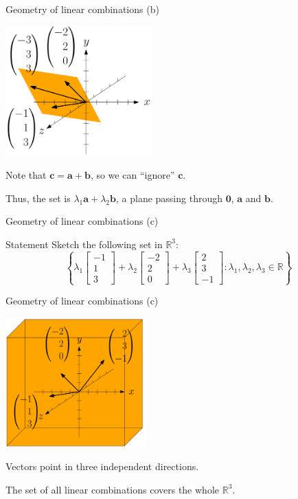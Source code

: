 \documentclass[10pt]{beamer}
\begin{document}
\begin{frame}{Geometry of linear combinations (b)}

    \begin{center}
        \includegraphics[height=5cm]{../img/png/3.b}
    \end{center}

    Note that $\mathbf c = \mathbf a + \mathbf b$, so we can ``ignore'' $\mathbf c$.

    Thus, the set is $\lambda_1 \mathbf a + \lambda_2 \mathbf b$, a plane passing through $\mathbf 0$, $\mathbf a$ and $\mathbf b$.
\end{frame}

\begin{frame}{Geometry of linear combinations (c)}
    \begin{block}{Statement}
    Sketch the following set in $\mathbb R^3$:
    $$\left\{\lambda_1 \begin{bmatrix}-1 \\ 1 \\ 3\end{bmatrix} + \lambda_2 \begin{bmatrix}-2 \\ 2 \\ 0\end{bmatrix} + \lambda_3 \begin{bmatrix}2 \\ 3 \\ -1\end{bmatrix} : \lambda_1, \lambda_2, \lambda_3 \in \mathbb R\right\}$$
    \end{block}
\end{frame}

\begin{frame}{Geometry of linear combinations (c)}
    \begin{center}
        \includegraphics[height=5cm]{../img/png/3.c}
    \end{center}

    Vectors point in three independent directions.

    The set of all linear combinations covers the whole $\mathbb R^3$.
\end{frame}
\end{document}
